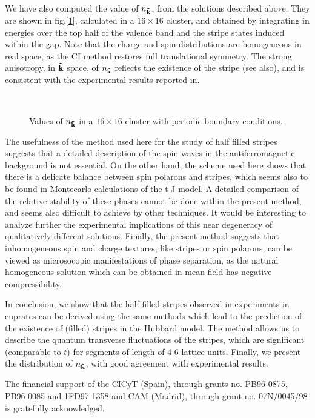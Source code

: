 We have also computed the value of $n_{\bf \vec{k}}$, from the solutions
described above.
They are shown in fig.[\ref{fig:nk}], calculated in a $16 \times 16$
cluster, and obtained by integrating in energies
over the top half of the valence band and the stripe states
induced within the gap. 
Note that the charge and spin distributions are homogeneous
in real space, as the CI method restores full translational symmetry.
The strong anisotropy, in ${\bf \vec{k}}$ space, of $n_{\bf \vec{k}}$
reflects the existence of the stripe (see also\cite{IM99,Zetal00}), 
and is consistent with
the experimental results reported in\cite{Zetal99}.
\begin{figure}
\mbox{\epsfxsize 8cm }
\caption{Values of $n_{\bf \vec{k}}$ in a $16 \times 16$ cluster with
periodic boundary conditions.}
\label{fig:nk}
\end{figure}
The usefulness of the method used here for the study of
half filled stripes suggests that a detailed description of the spin waves in the
antiferromagnetic background is not essential\cite{SDW}. On the other hand, 
the scheme used here shows that there is a delicate balance between spin
polarons\cite{VL91,LG98} and stripes, 
which seems also to be found in Montecarlo
calculations of the t-J model\cite{WS98,HM99,CS99,WS00,Metal00}. 
A detailed comparison of
the  relative stability of these phases cannot be done within the present
method, and seems also difficult to achieve by other
techniques. It would be interesting to analyze further the experimental
implications of this near degeneracy of qualitatively different solutions.
Finally, the present method suggests that inhomogeneous spin and charge
textures, like stripes or spin polarons, can be viewed as microsocopic
manifestations of phase separation, as the natural  homogeneous 
solution which can be obtained in mean field has negative compressibility\cite{Getal00}.

In conclusion, we show that the  half filled stripes observed in experiments
in cuprates can be derived using the same methods which lead to the prediction
of the existence of (filled) stripes 
in the Hubbard model\cite{ZG89,PR89,Sc90,VL91}.
The method allows us to
describe the quantum transverse fluctuations of the stripes, which are
significant (comparable to $t$) for segments of length
of 4-6 lattice units. 
Finally, we present the distribution
of $n_{\bf \vec{k}}$, with good agreement with experimental results.


The financial support of the CICyT (Spain), through
grants no. PB96-0875, PB96-0085
and 1FD97-1358 and CAM (Madrid), through grant
no. 07N/0045/98 is gratefully acknowledged.
   
